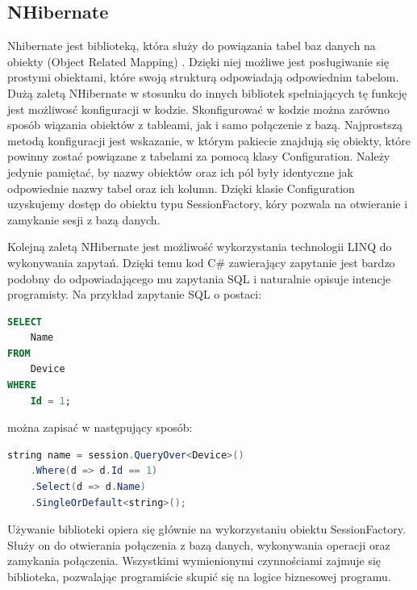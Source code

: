 \subsection{NHibernate}
Nhibernate jest biblioteką, która służy do powiązania tabel baz danych na obiekty (Object Related Mapping) \cite{nhibernate-doc}. Dzięki niej możliwe jest posługiwanie się prostymi obiektami, które swoją strukturą odpowiadają odpowiednim tabelom. Dużą zaletą NHibernate w stosunku do innych bibliotek spełniających tę funkcję jest możliwosć konfiguracji w kodzie. Skonfigurować w kodzie można zarówno sposób wiązania obiektów z tableami, jak i samo połączenie z bazą. Najprostszą metodą konfiguracji jest wskazanie, w którym pakiecie znajdują się obiekty, które powinny zostać powiązane z tabelami za pomocą klasy Configuration. Należy jedynie pamiętać, by nazwy obiektów oraz ich pól były identyczne jak odpowiednie nazwy tabel oraz ich kolumn. Dzięki klasie Configuration uzyskujemy dostęp do obiektu typu SessionFactory, kóry pozwala na otwieranie i zamykanie sesji z bazą danych. 

Kolejną zaletą NHibernate jest możliwość wykorzystania technologii LINQ do wykonywania zapytań. Dzięki temu kod C\# zawierający zapytanie jest bardzo podobny do odpowiadającego mu zapytania SQL i naturalnie opisuje intencje programisty. Na przykład zapytanie SQL o postaci:
\begin{lstlisting}[language=SQL]
SELECT
    Name
FROM
    Device
WHERE
    Id = 1;
\end{lstlisting}
można zapisać w następujący sposób:
\begin{lstlisting}[language=Java]
string name = session.QueryOver<Device>()
    .Where(d => d.Id == 1)
    .Select(d => d.Name)
    .SingleOrDefault<string>();
\end{lstlisting}
Używanie biblioteki opiera się głównie na wykorzystaniu obiektu SessionFactory. Służy on do otwierania połączenia z bazą danych, wykonywania operacji oraz zamykania połączenia. Wszystkimi wymienionymi czynnościami zajmuje się biblioteka, pozwalając programiście skupić się na logice biznesowej programu.

